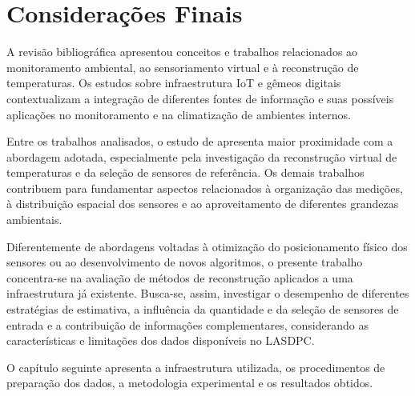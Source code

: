 \section{Considerações Finais}
\label{sec:consideracoes_finais_revisao}

A revisão bibliográfica apresentou conceitos e trabalhos relacionados ao monitoramento ambiental, ao sensoriamento virtual e à reconstrução de temperaturas. Os estudos sobre infraestrutura IoT e gêmeos digitais contextualizam a integração de diferentes fontes de informação e suas possíveis aplicações no monitoramento e na climatização de ambientes internos.

Entre os trabalhos analisados, o estudo de  apresenta maior proximidade com a abordagem adotada, especialmente pela investigação da reconstrução virtual de temperaturas e da seleção de sensores de referência. Os demais trabalhos contribuem para fundamentar aspectos relacionados à organização das medições, à distribuição espacial dos sensores e ao aproveitamento de diferentes grandezas ambientais.

Diferentemente de abordagens voltadas à otimização do posicionamento físico dos sensores ou ao desenvolvimento de novos algoritmos, o presente trabalho concentra-se na avaliação de métodos de reconstrução aplicados a uma infraestrutura já existente. Busca-se, assim, investigar o desempenho de diferentes estratégias de estimativa, a influência da quantidade e da seleção de sensores de entrada e a contribuição de informações complementares, considerando as características e limitações dos dados disponíveis no LASDPC.

O capítulo seguinte apresenta a infraestrutura utilizada, os procedimentos de preparação dos dados, a metodologia experimental e os resultados obtidos.



